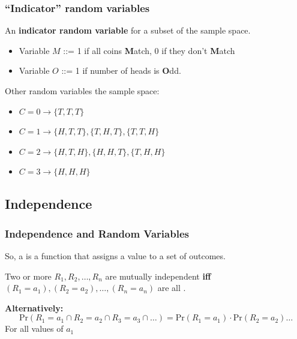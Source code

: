 \documentclass{beamer}
\begin{document}
\begin{frame}
  \frametitle{``Indicator'' random variables}

  An {\bf indicator random variable}  for
  a subset of the sample space.
  \begin{itemize}
  \item Variable $M$ ::= 1 if all coins {\bf M}atch, 0 if they don't {\bf M}atch
    \bigskip

  \item Variable $O$ ::= 1 if number of heads is {\bf O}dd.    
  \end{itemize}

  \vfill
  
  Other  random variables  the
  sample space:
  \begin{itemize}
  \item $C = 0 \to \{T,T,T\}$
  \item $C = 1 \to \{H,T,T\}, \{T,H,T\}, \{T,T,H\}$
  \item $C = 2 \to \{H,T,H\}, \{H,H,T\}, \{T,H,H\}$
  \item $C = 3 \to \{H,H,H\}$
  \end{itemize}
\end{frame}

\subsection{Independence}
\begin{frame}
  \frametitle{Independence and Random Variables}

  So, a  is a \alert{function} that assigns
  a value to a set of outcomes.

  \bigskip

  Two or more  $R_1, R_2, \ldots, R_n$ are
  mutually independent {\bf iff} $(R_1 = a_1), (R_2 = a_2), \ldots,
  (R_n = a_n)$ are all .

  \bigskip

  {\bf Alternatively:}\\
  \begin{equation*}
    \text{Pr}(R_1 = a_1 \cap R_2 = a_2 \cap R_3 = a_3 \cap \ldots) =
    \text{Pr}(R_1 = a_1)\cdot\text{Pr}(R_2 = a_2)\ldots
  \end{equation*}
  \hfill For all values of $a_1$
\end{frame}
\end{document}

